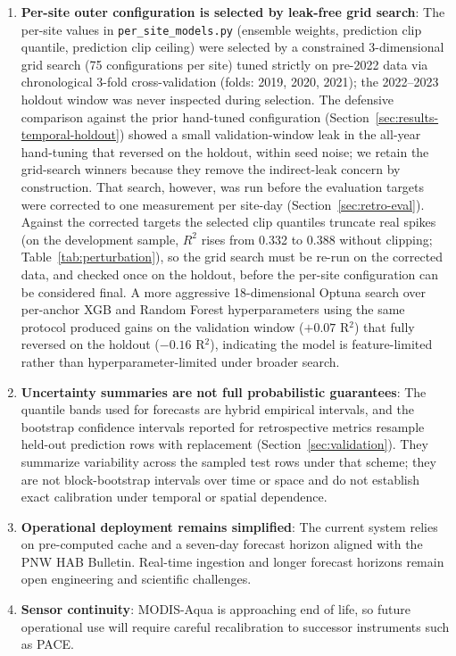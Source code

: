 \documentclass[toxins,article,submit,moreauthors]{Definitions/mdpi}
\begin{document}
\begin{enumerate}[nosep]
    \item \textbf{Per-site outer configuration is selected by leak-free grid search}: The per-site values in \texttt{per\_site\_models.py} (ensemble weights, prediction clip quantile, prediction clip ceiling) were selected by a constrained 3-dimensional grid search (75 configurations per site) tuned strictly on pre-2022 data via chronological 3-fold cross-validation (folds: 2019, 2020, 2021); the 2022--2023 holdout window was never inspected during selection. The defensive comparison against the prior hand-tuned configuration (Section~\ref{sec:results-temporal-holdout}) showed a small validation-window leak in the all-year hand-tuning that reversed on the holdout, within seed noise; we retain the grid-search winners because they remove the indirect-leak concern by construction. That search, however, was run before the evaluation targets were corrected to one measurement per site-day (Section~\ref{sec:retro-eval}). Against the corrected targets the selected clip quantiles truncate real spikes (on the development sample, $R^2$ rises from 0.332 to 0.388 without clipping; Table~\ref{tab:perturbation}), so the grid search must be re-run on the corrected data, and checked once on the holdout, before the per-site configuration can be considered final. A more aggressive 18-dimensional Optuna search over per-anchor XGB and Random Forest hyperparameters using the same protocol produced gains on the validation window ($+0.07$ R$^2$) that fully reversed on the holdout ($-0.16$ R$^2$), indicating the model is feature-limited rather than hyperparameter-limited under broader search.
    \item \textbf{Uncertainty summaries are not full probabilistic guarantees}: The quantile bands used for forecasts are hybrid empirical intervals, and the bootstrap confidence intervals reported for retrospective metrics resample held-out prediction rows with replacement (Section~\ref{sec:validation}). They summarize variability across the sampled test rows under that scheme; they are not block-bootstrap intervals over time or space and do not establish exact calibration under temporal or spatial dependence.
    \item \textbf{Operational deployment remains simplified}: The current system relies on pre-computed cache and a seven-day forecast horizon aligned with the PNW HAB Bulletin. Real-time ingestion and longer forecast horizons remain open engineering and scientific challenges.
    \item \textbf{Sensor continuity}: MODIS-Aqua is approaching end of life, so future operational use will require careful recalibration to successor instruments such as PACE.
\end{enumerate}
\end{document}
